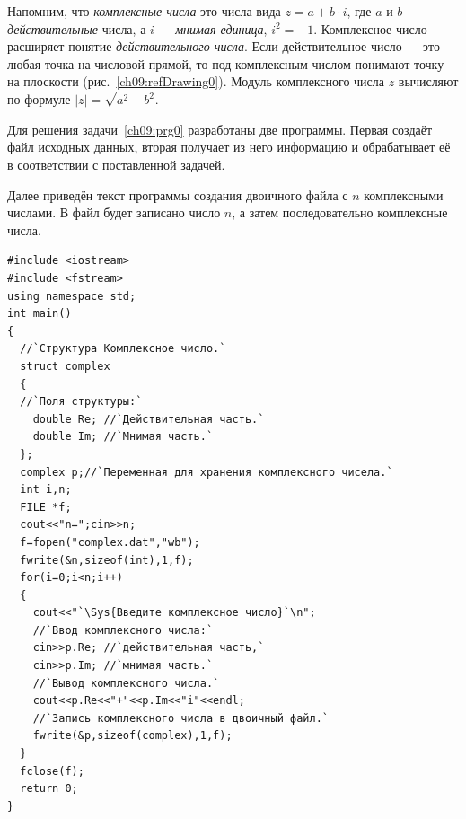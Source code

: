 
Напомним, что \emph{комплексные числа} это числа вида  $z=a+b\cdot i$, где  $a$  и $b$  ---
\emph{действительные} числа, а  $i$  --- \emph{мнимая единица},  $i^2=-1$. Комплексное число
расширяет понятие \emph{действительного числа}. Если действительное число --- это любая точка на числовой
прямой, то под комплексным числом понимают точку на плоскости (рис.~\ref{ch09:refDrawing0}). Модуль комплексного числа  $z$ 
вычисляют по формуле  $|z|=\sqrt{a^2+b^2}$.

Для решения задачи~\ref{ch09:prg0} разработаны две программы. Первая создаёт файл исходных данных, вторая получает из
него информацию и обрабатывает её в соответствии с поставленной задачей.

Далее приведён текст программы создания двоичного файла с $n$ комплексными числами. В файл
 будет записано число $n$, а затем последовательно комплексные
числа.
\begin{lstlisting}
#include <iostream>
#include <fstream>
using namespace std;
int main()
{
  //`Структура Комплексное число.`
  struct complex
  {
  //`Поля структуры:` 
    double Re; //`Действительная часть.`
    double Im; //`Мнимая часть.`
  };
  complex p;//`Переменная для хранения комплексного чисела.`
  int i,n;
  FILE *f;
  cout<<"n=";cin>>n;
  f=fopen("complex.dat","wb");
  fwrite(&n,sizeof(int),1,f);
  for(i=0;i<n;i++)
  {
    cout<<"`\Sys{Введите комплексное число}`\n";
    //`Ввод комплексного числа:`
    cin>>p.Re; //`действительная часть,`
    cin>>p.Im; //`мнимая часть.`
    //`Вывод комплексного числа.`
    cout<<p.Re<<"+"<<p.Im<<"i"<<endl;
    //`Запись комплексного числа в двоичный файл.`
    fwrite(&p,sizeof(complex),1,f);
  }
  fclose(f);
  return 0;
}
\end{lstlisting}

